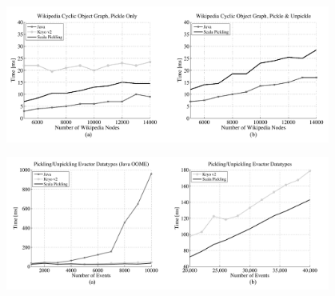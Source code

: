 \documentclass[preprint,10pt]{sigplanconf}
\theoremstyle{definition}
\theoremstyle{definition}
\newcommand{\todo}{{\bf \colorbox{red}{\color{white}TODO:}}}
\begin{document}






\begin{figure}[ht!]
 \centering
 \includegraphics[width=0.95\textwidth]{wikigraph.pdf}
 \caption{}
 \label{fig:wikigraph}
\end{figure}

\begin{figure}[ht!]
 \centering
 \includegraphics[width=0.95\textwidth]{evactor.pdf}
 \caption{}
 \label{fig:evactor}
\end{figure}
\end{document}
